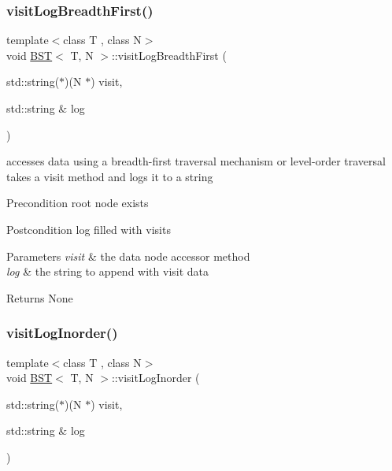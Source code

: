 \subsubsection{\texorpdfstring{visit\+Log\+Breadth\+First()}{visitLogBreadthFirst()}}
{\footnotesize\ttfamily template$<$class T , class N$>$ \\
void \hyperlink{class_b_s_t}{B\+ST}$<$ T, N $>$\+::visit\+Log\+Breadth\+First (\begin{DoxyParamCaption}\item[{std\+::string($\ast$)(N $\ast$)}]{visit,  }\item[{std\+::string \&}]{log }\end{DoxyParamCaption})}

accesses data using a breadth-\/first traversal mechanism or level-\/order traversal takes a visit method and logs it to a string \begin{DoxyPrecond}{Precondition}
root node exists 
\end{DoxyPrecond}
\begin{DoxyPostcond}{Postcondition}
log filled with visits 
\end{DoxyPostcond}

\begin{DoxyParams}{Parameters}
{\em visit} & the data node accessor method \\
\hline
{\em log} & the string to append with visit data \\
\hline
\end{DoxyParams}
\begin{DoxyReturn}{Returns}
None 
\end{DoxyReturn}
\mbox{\label{class_b_s_t_a04d669d91c9528c61f618d022999ea26}} 
\subsubsection{\texorpdfstring{visit\+Log\+Inorder()}{visitLogInorder()}}
{\footnotesize\ttfamily template$<$class T , class N$>$ \\
void \hyperlink{class_b_s_t}{B\+ST}$<$ T, N $>$\+::visit\+Log\+Inorder (\begin{DoxyParamCaption}\item[{std\+::string($\ast$)(N $\ast$)}]{visit,  }\item[{std\+::string \&}]{log }\end{DoxyParamCaption})}

